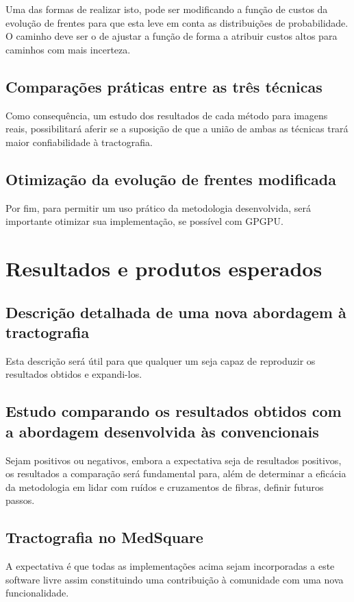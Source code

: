 \documentclass[a4paper,11pt]{report}
\begin{document}
  Uma das formas de realizar isto, pode ser modificando a função de custos da evolução de frentes para que esta leve em conta as distribuições de probabilidade. O caminho deve ser o de ajustar a função de forma a atribuir custos altos para caminhos com mais incerteza.

  \section{Comparações práticas entre as três técnicas}
  Como consequência, um estudo dos resultados de cada método para imagens reais, possibilitará aferir se a suposição de que a união de ambas as técnicas trará maior confiabilidade à tractografia.
  
  \section{Otimização da evolução de frentes modificada}
  Por fim, para permitir um uso prático da metodologia desenvolvida, será importante otimizar sua implementação, se possível com GPGPU.

\chapter{Resultados e produtos esperados}
  \section{Descrição detalhada de uma nova abordagem à tractografia}
  Esta descrição será útil para que qualquer um seja capaz de reproduzir os resultados obtidos e expandi-los.
  
  \section{Estudo comparando os resultados obtidos com a abordagem desenvolvida às convencionais}
  Sejam positivos ou negativos, embora a expectativa seja de resultados positivos, os resultados a comparação será fundamental para, além de determinar a eficácia da metodologia em lidar com ruídos e cruzamentos de fibras, definir futuros passos.

  \section{Tractografia no MedSquare}
  A expectativa é que todas as implementações acima sejam incorporadas a este software livre assim constituindo uma contribuição à comunidade com uma nova funcionalidade.
\end{document}
